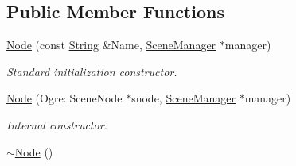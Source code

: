\subsection*{Public Member Functions}
\begin{DoxyCompactItemize}
\item 
\hyperlink{classphys_1_1Node_a09393f483ab4bb2fdb74b26a59ffd37e}{Node} (const \hyperlink{namespacephys_aa03900411993de7fbfec4789bc1d392e}{String} \&Name, \hyperlink{classphys_1_1SceneManager}{SceneManager} $\ast$manager)
\begin{DoxyCompactList}\small\item\em Standard initialization constructor. \item\end{DoxyCompactList}\item 
\hyperlink{classphys_1_1Node_af0f42610cf0adcef9e4dea16013cbaf2}{Node} (Ogre::SceneNode $\ast$snode, \hyperlink{classphys_1_1SceneManager}{SceneManager} $\ast$manager)
\begin{DoxyCompactList}\small\item\em Internal constructor. \item\end{DoxyCompactList}\item 
\hypertarget{classphys_1_1Node_af933598679e73d1e440f264f83e9d563}{
\hyperlink{classphys_1_1Node_af933598679e73d1e440f264f83e9d563}{$\sim$Node} ()}
\label{d0/ddc/classphys_1_1Node_af933598679e73d1e440f264f83e9d563}


\end{DoxyCompactItemize}
